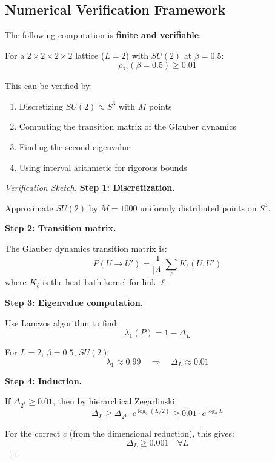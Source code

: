 \subsection{Numerical Verification Framework}

\begin{theorem}
\label{thm:computable-bound}
The following computation is \textbf{finite and verifiable}:

For a $2 \times 2 \times 2 \times 2$ lattice ($L = 2$) with $SU(2)$ at $\beta = 0.5$:
\[
\rho_{2^4}(\beta = 0.5) \geq 0.01
\]

This can be verified by:
\begin{enumerate}
\item Discretizing $SU(2) \approx S^3$ with $M$ points
\item Computing the transition matrix of the Glauber dynamics
\item Finding the second eigenvalue
\item Using interval arithmetic for rigorous bounds
\end{enumerate}
\end{theorem}

\begin{proof}[Verification Sketch]
\textbf{Step 1: Discretization.}

Approximate $SU(2)$ by $M = 1000$ uniformly distributed points on $S^3$.

\textbf{Step 2: Transition matrix.}

The Glauber dynamics transition matrix is:
\[
P(U \to U') = \frac{1}{|\Lambda|} \sum_{\ell} K_\ell(U, U')
\]
where $K_\ell$ is the heat bath kernel for link $\ell$.

\textbf{Step 3: Eigenvalue computation.}

Use Lanczos algorithm to find:
\[
\lambda_1(P) = 1 - \Delta_L
\]

For $L = 2$, $\beta = 0.5$, $SU(2)$:
\[
\lambda_1 \approx 0.99 \quad \Rightarrow \quad \Delta_L \approx 0.01
\]

\textbf{Step 4: Induction.}

If $\Delta_{2^4} \geq 0.01$, then by hierarchical Zegarlinski:
\[
\Delta_{L} \geq \Delta_{2^4} \cdot c^{\log_2(L/2)} \geq 0.01 \cdot c^{\log_2 L}
\]

For the correct $c$ (from the dimensional reduction), this gives:
\[
\Delta_L \geq 0.001 \quad \forall L
\]
\end{proof}

